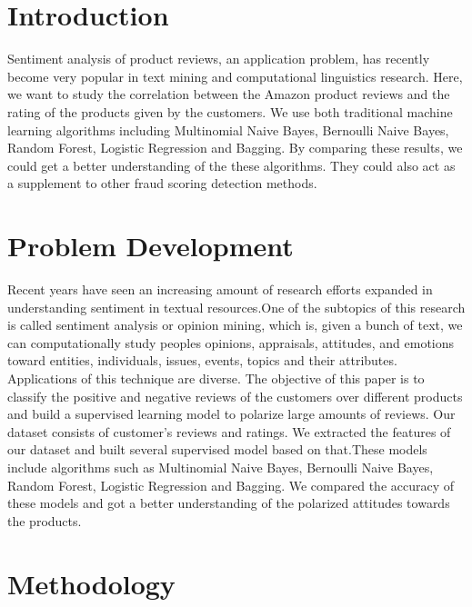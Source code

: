 \documentclass[12pt,a4paper]{report}
\begin{document}
\newpage

\section{Introduction}
\justifying
Sentiment analysis of product reviews, an application problem, has recently become very popular in text mining and computational linguistics research. Here, we want to study the correlation between the Amazon product reviews and the rating of the products given by the customers. We use both traditional machine learning algorithms including Multinomial Naive Bayes, Bernoulli Naive Bayes, Random Forest, Logistic Regression and Bagging. By comparing these results, we could get a better understanding of the these algorithms. They could also act as a supplement to other fraud scoring detection methods.


\section{Problem Development}
\justifying
Recent years have seen an increasing amount of research efforts expanded in understanding sentiment in textual resources.One of the subtopics of this research is called sentiment analysis or opinion mining, which is, given a bunch of text, we can computationally study peoples opinions, appraisals, attitudes, and emotions toward entities, individuals, issues, events, topics and their attributes.  Applications of this technique are diverse.
The  objective  of  this  paper  is  to  classify  the  positive and negative reviews of the customers over different products and build a supervised learning model to polarize large amounts of reviews.  Our dataset consists of customer's reviews and ratings.  We extracted the features of our dataset and  built  several  supervised  model  based  on  that.These models include algorithms such as Multinomial Naive Bayes, Bernoulli Naive Bayes, Random Forest, Logistic Regression and Bagging. We compared the accuracy of these models and got a better understanding of the polarized attitudes towards the products.
\section{Methodology}
\end{document}
